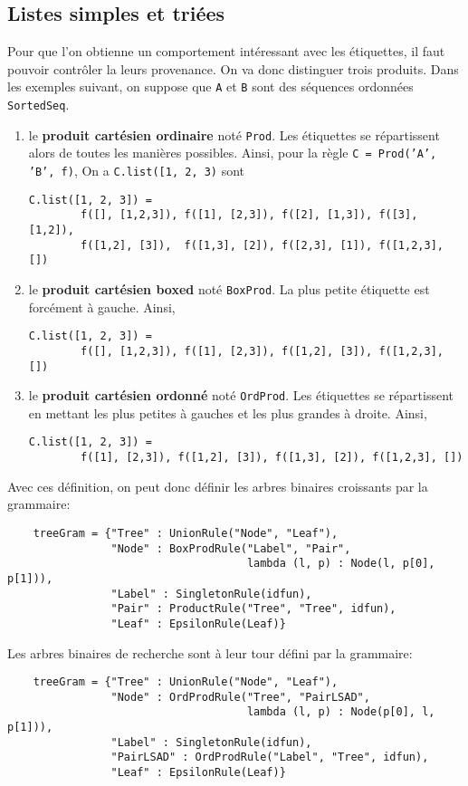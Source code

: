 \documentclass[11pt]{article}
\begin{document}
\subsection{Listes simples et triées}

Pour que l'on obtienne un comportement intéressant avec les étiquettes, il
faut pouvoir contrôler la leurs provenance. On va donc distinguer trois
produits. Dans les exemples suivant, on suppose que \texttt{A} et \texttt{B}
sont des séquences ordonnées \texttt{SortedSeq}.
\begin{enumerate}
\item le \textbf{produit cartésien ordinaire} noté \texttt{Prod}. Les
  étiquettes se répartissent alors de toutes les manières possibles. Ainsi,
  pour la règle \texttt{C = Prod('A', 'B', f)}, On a
  \texttt{C.list([1, 2, 3)} sont
\begin{verbatim}
C.list([1, 2, 3]) =
        f([], [1,2,3]), f([1], [2,3]), f([2], [1,3]), f([3], [1,2]),
        f([1,2], [3]),  f([1,3], [2]), f([2,3], [1]), f([1,2,3], [])
\end{verbatim}
\item le \textbf{produit cartésien boxed} noté \texttt{BoxProd}. La plus petite
  étiquette est forcément à gauche. Ainsi,
\begin{verbatim}
C.list([1, 2, 3]) =
        f([], [1,2,3]), f([1], [2,3]), f([1,2], [3]), f([1,2,3], [])
\end{verbatim}
\item le \textbf{produit cartésien ordonné} noté \texttt{OrdProd}. Les
  étiquettes se répartissent en mettant les plus petites à gauches et les plus
  grandes à droite. Ainsi,
\begin{verbatim}
C.list([1, 2, 3]) =
        f([1], [2,3]), f([1,2], [3]), f([1,3], [2]), f([1,2,3], [])
\end{verbatim}
\end{enumerate}
Avec ces définition, on peut donc définir les arbres binaires croissants par
la grammaire:
\begin{verbatim}
    treeGram = {"Tree" : UnionRule("Node", "Leaf"),
                "Node" : BoxProdRule("Label", "Pair",
                                     lambda (l, p) : Node(l, p[0], p[1])),
                "Label" : SingletonRule(idfun),
                "Pair" : ProductRule("Tree", "Tree", idfun),
                "Leaf" : EpsilonRule(Leaf)}
\end{verbatim}
Les arbres binaires de recherche sont à leur tour défini par la grammaire:
\begin{verbatim}
    treeGram = {"Tree" : UnionRule("Node", "Leaf"),
                "Node" : OrdProdRule("Tree", "PairLSAD",
                                     lambda (l, p) : Node(p[0], l, p[1])),
                "Label" : SingletonRule(idfun),
                "PairLSAD" : OrdProdRule("Label", "Tree", idfun),
                "Leaf" : EpsilonRule(Leaf)}
\end{verbatim}
\end{document}
